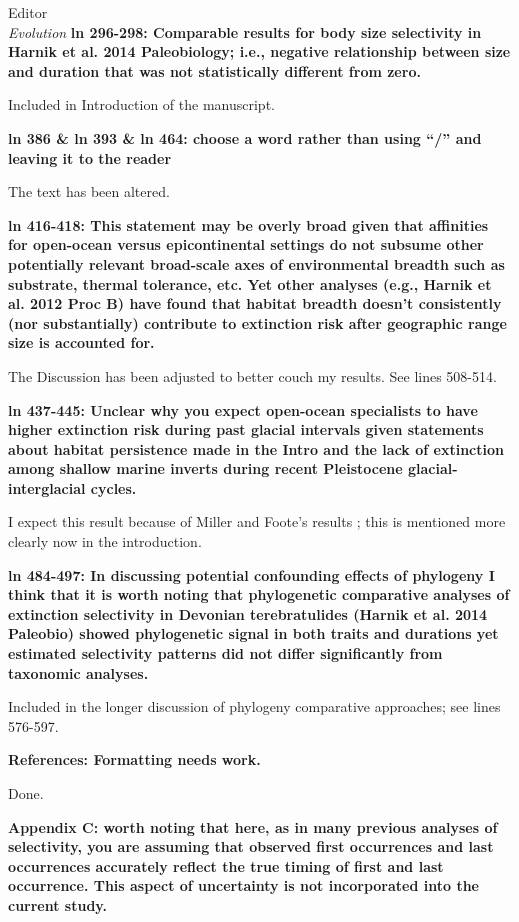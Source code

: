 \documentclass{letter}
\begin{document}
\begin{letter}{Editor \\ \textit{Evolution}}
  \textbf{ln 296-298: Comparable results for body size selectivity in Harnik et al. 2014 Paleobiology; i.e., negative relationship between size and duration that was not statistically different from zero.}

  Included in Introduction of the manuscript.

  \textbf{ln 386 \& ln 393 \& ln 464: choose a word rather than using “/” and leaving it to the reader}

  The text has been altered.

  \textbf{ln 416-418: This statement may be overly broad given that affinities for open-ocean versus epicontinental settings do not subsume other potentially relevant broad-scale axes of environmental breadth such as substrate, thermal tolerance, etc. Yet other analyses (e.g., Harnik et al. 2012 Proc B) have found that habitat breadth doesn’t consistently (nor substantially) contribute to extinction risk after geographic range size is accounted for.}

  The Discussion has been adjusted to better couch my results. See lines 508-514. %

  \textbf{ln 437-445: Unclear why you expect open-ocean specialists to have higher extinction risk during past glacial intervals given statements about habitat persistence made in the Intro and the lack of extinction among shallow marine inverts during recent Pleistocene glacial-interglacial cycles.}

  I expect this result because of Miller and Foote's results \cite{Miller2009a}; this is mentioned more clearly now in the introduction. 

  \textbf{ln 484-497: In discussing potential confounding effects of phylogeny I think that it is worth noting that phylogenetic comparative analyses of extinction selectivity in Devonian terebratulides (Harnik et al. 2014 Paleobio) showed phylogenetic signal in both traits and durations yet estimated selectivity patterns did not differ significantly from taxonomic analyses.}

  Included in the longer discussion of phylogeny comparative approaches; see lines 576-597. %

  \textbf{References: Formatting needs work.}

  Done.

  \textbf{Appendix C: worth noting that here, as in many previous analyses of selectivity, you are assuming that observed first occurrences and last occurrences accurately reflect the true timing of first and last occurrence. This aspect of uncertainty is not incorporated into the current study.}


\end{letter}
\end{document}
